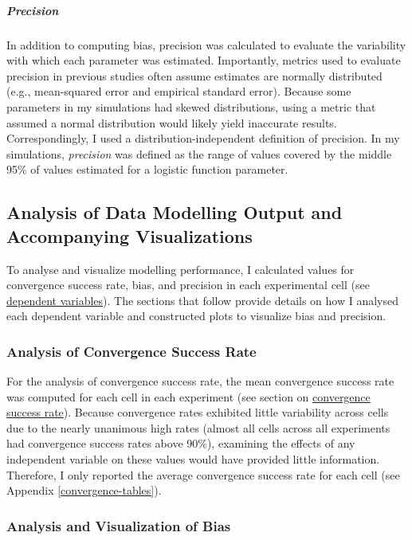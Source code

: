 \documentclass[
12pt, %
twoside,
english]{guelphthesis}
\begin{document}
\hypertarget{pres-precision}{%
\subparagraph{Precision}\label{pres-precision}}

In addition to computing bias, precision was calculated to evaluate the variability with which each parameter was estimated. Importantly, metrics used to evaluate precision in previous studies often assume estimates are normally distributed (e.g., mean-squared error and empirical standard error). Because some parameters in my simulations had skewed distributions, using a metric that assumed a normal distribution would likely yield inaccurate results. Correspondingly, I used a distribution-independent definition of precision. In my simulations, \emph{precision} was defined as the range of values covered by the middle 95\% of values estimated for a logistic function parameter.

\hypertarget{analysis-visualization}{%
\subsection{Analysis of Data Modelling Output and Accompanying Visualizations}\label{analysis-visualization}}

To analyse and visualize modelling performance, I calculated values for convergence success rate, bias, and precision in each experimental cell (see \protect\hyperlink{dependent-variables}{dependent variables}). The sections that follow provide details on how I analysed each dependent variable and constructed plots to visualize bias and precision.

\hypertarget{convergence-analysis}{%
\subsubsection{Analysis of Convergence Success Rate}\label{convergence-analysis}}

For the analysis of convergence success rate, the mean convergence success rate was computed for each cell in each experiment (see section on \protect\hyperlink{convergence}{convergence success rate}). Because convergence rates exhibited little variability across cells due to the nearly unanimous high rates (almost all cells across all experiments had convergence success rates above 90\%), examining the effects of any independent variable on these values would have provided little information. Therefore, I only reported the average convergence success rate for each cell (see Appendix \ref{convergence-tables}).

\hypertarget{bias-analysis}{%
\subsubsection{Analysis and Visualization of Bias}\label{bias-analysis}}
\end{document}
